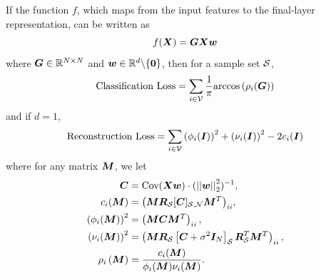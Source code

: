 \begin{theorem}
\label{thm:general_class_err}
    If the function $f$, which maps from the input features to the final-layer representation, can be written as $$f(\bm{X}) = \bm{G}\bm{X}\bm{w}$$ where $\bm{G}\in \mathbb{R}^{N \times N}$ and $\bm{w} \in \mathbb{R}^{d} \backslash \{\bm{0}\}$, then for a sample set $\mathcal{S}$,
    \begin{align}
         \text{Classification Loss}  = \sum_{i \in \mathcal{V}} \frac{1}{\pi}\text{arccos}\left( \rho_{i}(\bm{G}) \right) \label{eq:gen_class_err}
        \end{align}
    and if $d=1$,
        \begin{align}
        \text{Reconstruction Loss}  =  \sum_{i \in \mathcal{V}} \left(\phi_{i}(\bm{I})\right)^{2} + \left(\nu_{i}(\bm{I})\right)^{2} - 2c_{i}(\bm{I}) \label{eq:gen_rec_err}
    \end{align}
    where for any matrix $\bm{M}$, we let
    \begin{align}
        \matr{C} &= \text{Cov}(\matr{X}\vect{w}) \cdot (\sqnormvec{\vect{w}})^{-1},\\
        c_{i}(\matr{M}) &={\left(\matr{M}\matr{R}_{\set{S}}\matrsub[S,N]{C} \matr{M}^{T}\right)_{ii}}, \\
        \left(\phi_{i}(\matr{M})\right)^{2} &= \left(\matr{M}\matr{C}\matr{M}^{T}\right)_{ii}, \\
        \left(\nu_{i}(\matr{M})\right)^{2} &= \left( \matr{M}\matr{R}_{\set{S}}\msubgen[\set{S}]{\matr{C} + \sigma^{2}\matr{I}_{N}} \matr{R}_{\set{S}}^{T} \matr{M}^{T}\right)_{ii},\\
        \rho_{i}\left(\matr{M}\right) &= \frac{c_{i}(\matr{M})}{\phi_{i}(\matr{M})\nu_{i}(\matr{M})}.
    \end{align}
\end{theorem}
